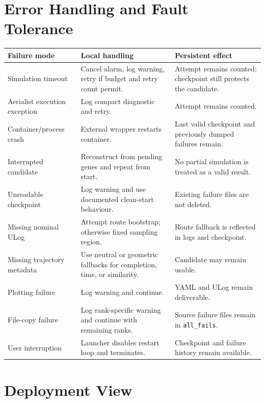 \documentclass[11pt,a4paper,openany]{report}
\newcommand{\code}[1]{\texttt{#1}}
\begin{document}
\section{Error Handling and Fault Tolerance}
\begin{table}[H]
\centering
\begin{tabularx}{\textwidth}{L{4cm} Y Y}
\toprule
\textbf{Failure mode} & \textbf{Local handling} & \textbf{Persistent effect}\\
\midrule
Simulation timeout & Cancel alarm, log warning, retry if budget and retry count permit. & Attempt remains counted; checkpoint still protects the candidate.\\
Aerialist execution exception & Log compact diagnostic and retry. & Attempt remains counted.\\
Container/process crash & External wrapper restarts container. & Last valid checkpoint and previously dumped failures remain.\\
Interrupted candidate & Reconstruct from pending genes and repeat from start. & No partial simulation is treated as a valid result.\\
Unreadable checkpoint & Log warning and use documented clean-start behaviour. & Existing failure files are not deleted.\\
Missing nominal ULog & Attempt route bootstrap; otherwise fixed sampling region. & Route fallback is reflected in logs and checkpoint.\\
Missing trajectory metadata & Use neutral or geometric fallbacks for completion, time, or similarity. & Candidate may remain usable.\\
Plotting failure & Log warning and continue. & YAML and ULog remain deliverable.\\
File-copy failure & Log rank-specific warning and continue with remaining ranks. & Source failure files remain in \code{all\_fails}.\\
User interruption & Launcher disables restart loop and terminates. & Checkpoint and failure history remain available.\\
\bottomrule
\end{tabularx}
\end{table}

\section{Deployment View}
\end{document}
